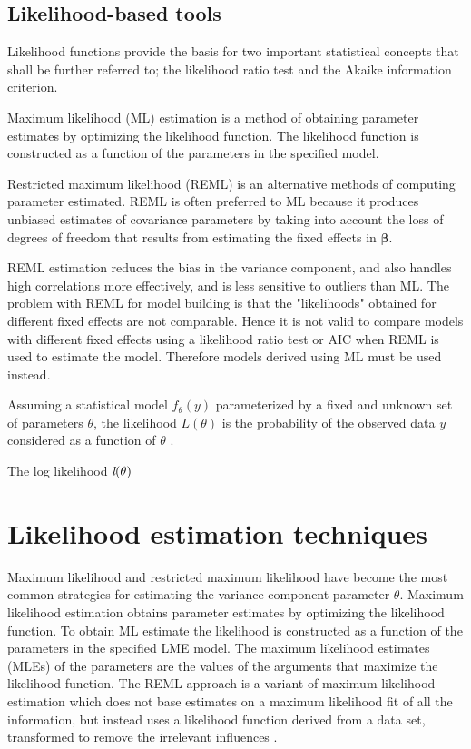 \documentclass[12pt, a4paper]{report}
\theoremstyle{plain}
\theoremstyle{definition}
\theoremstyle{remark}
\begin{document}
\subsection{Likelihood-based tools}
Likelihood functions provide the basis for two important statistical concepts that shall be further referred to; the likelihood ratio test and the Akaike information criterion.

Maximum likelihood (ML) estimation is a method of obtaining
parameter estimates by optimizing the likelihood function. The
likelihood function is constructed as a function of the parameters
in the specified model.

Restricted maximum likelihood (REML) is an alternative methods of
computing parameter estimated. REML is often preferred to ML
because it produces unbiased estimates of covariance parameters by
taking into account the loss of degrees of freedom that results
from estimating the fixed effects in $\boldsymbol{\beta}$.

REML estimation reduces the bias in the variance component, and also handles high correlations
more effectively, and is less sensitive to outliers than ML.  The problem with REML for model building is that the "likelihoods" obtained for different fixed effects are not comparable. Hence it is not valid to compare models
with different fixed effects using a likelihood ratio test or AIC when REML is used to
estimate the model. Therefore models derived using ML must be used instead.





Assuming a statistical model $f_{\theta}(y)$ parameterized by a fixed and unknown set of parameters $\theta$, the likelihood $L(\theta)$ is the probability of the observed data $y$ considered as a function of $\theta$ \citep{youngjo}.

The log likelihood $\emph{l}(\theta)$






\section{Likelihood estimation techniques}
Maximum likelihood and restricted maximum likelihood have become the most common strategies for estimating the variance component parameter $\theta.$ Maximum likelihood estimation obtains
parameter estimates by optimizing the likelihood function. To obtain ML estimate the likelihood is constructed as a function of the parameters in the specified LME model. The maximum likelihood estimates (MLEs) of the parameters are the values of the arguments that maximize the likelihood function. The REML approach is a variant of maximum likelihood estimation which does not base estimates on a maximum likelihood fit of all the information, but instead uses a likelihood function derived from a data set, transformed to remove the irrelevant influences \citep{REMLDefine}.
\end{document}
